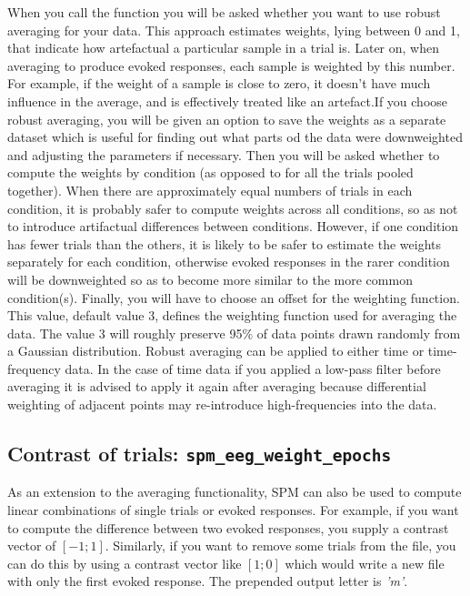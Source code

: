 When you call the function you will be asked whether you want to use robust averaging for your data. This approach estimates weights, lying between 0 and 1, that indicate how artefactual a particular sample in a trial is. Later on, when averaging to produce evoked responses, each sample is weighted by this number. For example, if the weight of a sample is close to zero, it doesn't have much influence in the average, and is effectively treated like an artefact.If you choose robust averaging, you will be given an option to save the weights as a separate dataset which is useful for finding out what parts od the data were downweighted and adjusting the parameters if necessary. Then you will be asked whether to compute the weights by condition (as opposed to for all the trials pooled together). When there are approximately equal numbers of trials in each condition, it is probably safer to compute weights across all conditions, so as not to introduce artifactual differences between conditions. However, if one condition has fewer trials than the others, it is likely to be safer to estimate the weights separately for each condition, otherwise evoked responses in the rarer condition will be downweighted so as to become more similar to the more common condition(s). Finally, you will have to choose an offset for the weighting function. This value, default value 3, defines the weighting function used for averaging the data. The value 3 will roughly preserve 95\% of data points drawn randomly from a Gaussian distribution. Robust averaging can be applied to either time or time-frequency data. In the case of time data if you applied a low-pass filter before averaging it is advised to apply it again after averaging because differential weighting of adjacent points may re-introduce high-frequencies into the data. 

\subsection{Contrast of trials: \texttt{spm\_eeg\_weight\_epochs}}
As an extension to the averaging functionality, SPM can also be used to compute linear combinations of single trials or evoked responses. For example, if you want to compute the difference between two evoked responses, you supply a contrast vector of $[-1; 1]$. Similarly, if you want to remove some trials from the file, you can do this by using a contrast vector like $[1; 0]$ which would write a new file with only the first evoked response. The prepended output letter is \textit{'m'}.

